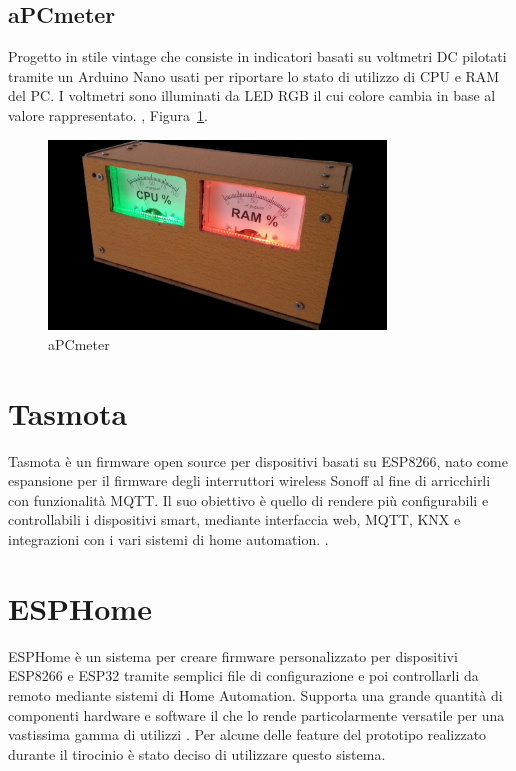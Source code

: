 \documentclass[12pt,a4paper]{report}
\begin{document}
\subsection{aPCmeter}
Progetto in stile vintage che consiste in indicatori basati su voltmetri DC pilotati tramite un Arduino Nano usati per riportare lo stato di
utilizzo di CPU e RAM del PC. I voltmetri sono illuminati da LED RGB il cui colore cambia in base al valore rappresentato.
\cite{apcmeter}, Figura~\ref{fig:apcmeter}.

\begin{figure}[h]
  \centering
  \includegraphics[width=0.8\textwidth]{apcmeter}
  \caption{aPCmeter \cite{apcmeter}}
  \label{fig:apcmeter}
\end{figure}


\section{Tasmota}
Tasmota è un firmware open source per dispositivi basati su ESP8266, nato come espansione per il firmware degli interruttori
wireless Sonoff al fine di arricchirli con funzionalità MQTT. Il suo obiettivo è quello di rendere più configurabili e controllabili i dispositivi
smart, mediante interfaccia web, MQTT, KNX e integrazioni con i vari sistemi di home automation.
\cite{abouttasmota}.

\section{ESPHome}
ESPHome è un sistema per creare firmware personalizzato per dispositivi ESP8266 e ESP32 tramite semplici file di configurazione e poi controllarli
da remoto mediante sistemi di Home Automation.
Supporta una grande quantità di componenti hardware e software il che lo rende particolarmente versatile per una vastissima gamma di utilizzi
\cite{esphomeio}.
Per alcune delle feature del prototipo realizzato durante il tirocinio è stato deciso di utilizzare questo sistema.
\end{document}
